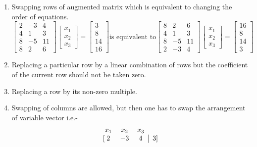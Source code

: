 \documentclass{article}
\begin{document}
\begin{enumerate}
    \item Swapping rows of augmented matrix which is equivalent to changing the order of equations.
     \[       
        \begin{bmatrix}
           2 & -3 & 4\\
           4 & 1 & 3\\
           8 & -5 & 11\\
           8 & 2 & 6
       \end{bmatrix}
        \begin{bmatrix}
            x_1\\x_2\\x_3
        \end{bmatrix} = 
        \begin{bmatrix}
                    3\\8\\14\\16
        \end{bmatrix} \text{is equivalent to}
        \begin{bmatrix}
           8 & 2 & 6\\
           4 & 1 & 3\\
           8 & -5 & 11\\
           2 & -3 & 4
        \end{bmatrix}
        \begin{bmatrix}
            x_1\\x_2\\x_3
        \end{bmatrix} = 
        \begin{bmatrix}
            16\\8\\14\\3
        \end{bmatrix}
    \]
    \item Replacing a particular row by a linear combination of rows but the coefficient of the current row should not be taken zero.
    \item Replacing a row by its non-zero multiple.
    \item Swapping of columns are allowed, but then one has to swap the arrangement of variable vector i.e.-
      \[
        \begin{blockarray}{cccc}
        x_1 & x_2 & x_3 && \\
        \begin{block}{[ccc|c]}
        2 & -3 & 4 & 3 \\

\end{block}
\end{blockarray}\]
\end{enumerate}
\end{document}
